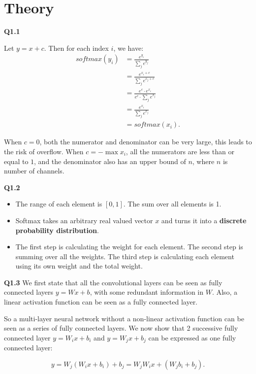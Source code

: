 \documentclass[
  course = {{16-720B Computer Vision}},
  quartile = {{1}},
  assignment = 3-Neural\ Networks\ for\ Recognition,
  name = {{Kangle Deng}},
  email = {{kangled@andrew.cmu.edu}},
  firstexercise = 1
]{aga-homework}
\begin{document}
\section{Theory}
\noindent \textbf{Q1.1} 

Let $y = x + c$. Then for each index $i$, we have:
\begin{equation*}
\begin{aligned}
    softmax(y_i) & = \frac{e^{y_i}}{\sum_j e^{y_j}} \\
    & = \frac{e^{x_i + c}}{\sum_j e^{x_j + c}} \\
    & = \frac{e^c \cdot e^{x_i}}{e^c \cdot \sum_j e^{x_j}} \\
    & =  \frac{e^{x_i}}{\sum_j e^{x_j}} \\
    & = softmax(x_i).
\end{aligned}
\end{equation*}

When $c = 0$, both the numerator and denominator can be very large, this leads to the risk of overflow. When $c = -\max x_i$, all the numerators are less than or equal to $1$, and the denominator also has an upper bound of $n$, where $n$ is number of channels.

\noindent \textbf{Q1.2}

\begin{itemize}
    \item The range of each element is $[0,1]$. The sum over all elements is 1.
    \item Softmax takes an arbitrary real valued vector $x$ and turns it into a \textbf{discrete probability distribution}.
    \item The first step is calculating the weight for each element. The second step is summing over all the weights. The third step is calculating each element using its own weight and the total weight.
\end{itemize}

\noindent \textbf{Q1.3}
We first state that all the convolutional layers can be seen as fully connected layers $y = Wx + b$, with some redundant information in $W$. Also, a linear activation function can be seen as a fully connected layer.

So a multi-layer neural network without a non-linear activation function can be seen as a series of fully connected layers. We now show that 2 successive fully connected layer $y = W_ix + b_i$ and $y = W_jx+b_j$ can be expressed as one fully connected layer:

\begin{equation*}
    y = W_j(W_ix + b_i) + b_j = W_jW_ix + (W_jb_i + b_j).
\end{equation*}
\end{document}
